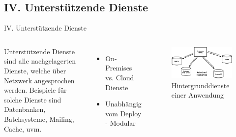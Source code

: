 \documentclass{beamer}
\begin{document}
			\subsection{IV. Unterstützende Dienste}
				\begin{frame}{IV. Unterstützende Dienste}
					\begin{columns}
					Unterstützende Dienste sind alle nachgelagerten Dienste, welche über Netzwerk angesprochen werden. Beispiele für solche Dienste sind Datenbanken, Batchsysteme, Mailing, Cache, uvm.
					\begin{itemize}
						\item On-Premises vs. Cloud Dienste
						\item Unabhängig vom Deploy - Modular
					\end{itemize}
					\begin{figure}
						\includegraphics[width=\textwidth]{attached-resources.png}
						\caption{Hintergrunddienste einer Anwendung \cite{factor-subdienst}}
					\end{figure}
					\end{columns}
				\end{frame}
\end{document}
